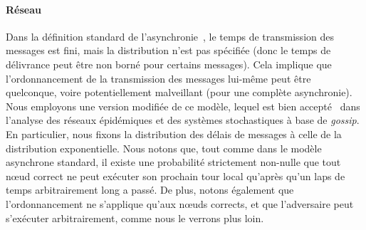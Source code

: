 \documentclass[letterpaper,twocolumn,10pt]{article}
\theoremstyle{definition}
\begin{document}
\paragraph{Réseau} 
Dans la définition standard de l'asynchronie~\cite{ben1983another}, le temps de transmission des messages est fini, mais la distribution n'est pas spécifiée (donc le temps de délivrance peut être non borné pour certains messages). Cela implique que l'ordonnancement de la transmission des messages lui-même peut être quelconque, voire potentiellement malveillant (pour une complète asynchronie).
Nous employons une version modifiée de ce modèle, lequel est bien accepté~\cite{banerjee2014epidemic, ganesh2005effect, draief2006thresholds, keeling2011modeling, liggett1997stochastic} dans l'analyse des réseaux épidémiques et des systèmes stochastiques à base de \emph{gossip}. En particulier, nous fixons la distribution des délais de messages à celle de la distribution exponentielle.
Nous notons que, tout comme dans le modèle asynchrone standard, il existe une probabilité strictement non-nulle que tout nœud correct ne peut exécuter son prochain tour local qu'après qu'un laps de temps arbitrairement long a passé.
De plus, notons également que l'ordonnancement ne s'applique qu'aux nœuds corrects, et que l'adversaire peut s'exécuter arbitrairement, comme nous le verrons plus loin.
\end{document}
